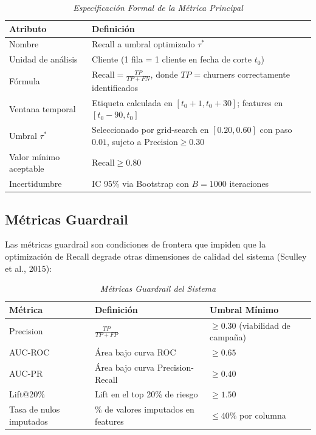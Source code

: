\documentclass[12pt,a4paper]{article}
\begin{document}
\begin{table}[htbp]
\centering
\caption{\textit{Especificación Formal de la Métrica Principal}}
\label{tab:metrica_principal}
\begin{tabular}{@{}p{4cm}p{9.5cm}@{}}
\toprule
\textbf{Atributo} & \textbf{Definición} \\
\midrule
Nombre & Recall a umbral optimizado $\tau^*$ \\
Unidad de análisis & Cliente (1 fila = 1 cliente en fecha de corte $t_0$) \\
Fórmula & $\text{Recall} = \frac{TP}{TP + FN}$, donde $TP$ = churners correctamente identificados \\
Ventana temporal & Etiqueta calculada en $[t_0 + 1, t_0 + 30]$; features en $[t_0 - 90, t_0]$ \\
Umbral $\tau^*$ & Seleccionado por grid-search en $[0.20, 0.60]$ con paso $0.01$, sujeto a $\text{Precision} \geq 0.30$ \\
Valor mínimo aceptable & $\text{Recall} \geq 0.80$ \\
Incertidumbre & IC 95\% via Bootstrap con $B = 1000$ iteraciones \\
\bottomrule
\end{tabular}
\end{table}

\subsection{Métricas Guardrail}

Las métricas guardrail son condiciones de frontera que impiden que la optimización de Recall degrade otras dimensiones de calidad del sistema (Sculley et al., 2015):

\begin{table}[htbp]
\centering
\caption{\textit{Métricas Guardrail del Sistema}}
\label{tab:guardrail}
\begin{tabular}{@{}p{3.5cm}p{4.5cm}p{4.5cm}@{}}
\toprule
\textbf{Métrica} & \textbf{Definición} & \textbf{Umbral Mínimo} \\
\midrule
Precision & $\frac{TP}{TP + FP}$ & $\geq 0.30$ (viabilidad de campaña) \\
AUC-ROC & Área bajo curva ROC & $\geq 0.65$ \\
AUC-PR & Área bajo curva Precision-Recall & $\geq 0.40$ \\
Lift@20\% & Lift en el top 20\% de riesgo & $\geq 1.50$ \\
Tasa de nulos imputados & \% de valores imputados en features & $\leq 40\%$ por columna \\
\bottomrule
\end{tabular}
\end{table}
\end{document}
